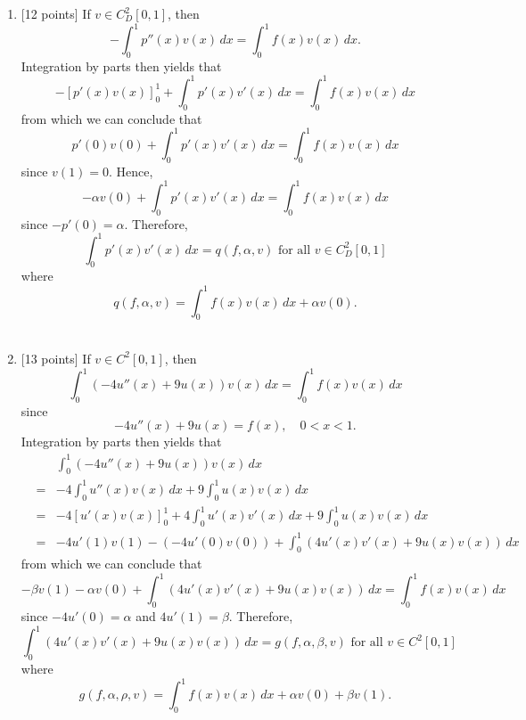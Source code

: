 \begin{solution}
\begin{enumerate}
\item {[12 points]} If $v\in C^2_D[0,1]$, then
\[
-\int_0^1p''(x)v(x)\,dx=\int_0^1f(x)v(x)\,dx.
\]
Integration by parts then yields that
\[
-[p'(x)v(x)]_0^1+\int_0^1p'(x)v'(x)\,dx=\int_0^1f(x)v(x)\,dx
\]
from which we can conclude that
\[
p'(0)v(0)+\int_0^1p'(x)v'(x)\,dx=\int_0^1f(x)v(x)\,dx
\]
since $v(1)=0$. Hence,
\[
-\alpha v(0)+\int_0^1p'(x)v'(x)\,dx=\int_0^1f(x)v(x)\,dx
\]
since $-p'(0)=\alpha$. Therefore,
\[
\int_0^1p'(x)v'(x)\,dx=q(f,\alpha,v)\mbox{ for all }v\in C^2_D[0,1]
\]
where
\[
q(f,\alpha,v)=\int_0^1f(x)v(x)\,dx+\alpha v(0).
\]
\\
\item {[13 points]} If $v\in C^2[0,1]$, then
\[
\int_0^1\left(-4u''(x)+9u(x)\right)v(x)\,dx=\int_0^1f(x)v(x)\,dx
\]
since
\[
-4u''(x)+9u(x)=f(x),\quad 0<x<1.
\]
Integration by parts then yields that
\begin{eqnarray*}
&&\int_0^1\left(-4u''(x)+9u(x)\right)v(x)\,dx
\\
&=&-4\int_0^1u''(x)v(x)\,dx+9\int_0^1u(x)v(x)\,dx
\\
&=&-4\left[u'(x)v(x)\right]_0^1+4\int_0^1u'(x)v'(x)\,dx+9\int_0^1u(x)v(x)\,dx
\\
&=&-4u'(1)v(1)-\left(-4u'(0)v(0)\right)+\int_0^1\left(4u'(x)v'(x)+9u(x)v(x)\right)\,dx
\end{eqnarray*}
from which we can conclude that
\[
-\beta v(1)-\alpha v(0)+\int_0^1\left(4u'(x)v'(x)+9u(x)v(x)\right)\,dx=\int_0^1f(x)v(x)\,dx
\]
since $-4u'(0)=\alpha$ and $4u'(1)=\beta$. Therefore,
\[
\int_0^1\left(4u'(x)v'(x)+9u(x)v(x)\right)\,dx=g(f,\alpha,\beta,v)\mbox{ for all }v\in C^2[0,1]
\]
where
\[
g(f,\alpha,\rho,v)=\int_0^1f(x)v(x)\,dx+\alpha v(0)+\beta v(1).
\]
\end{enumerate}
\end{solution}